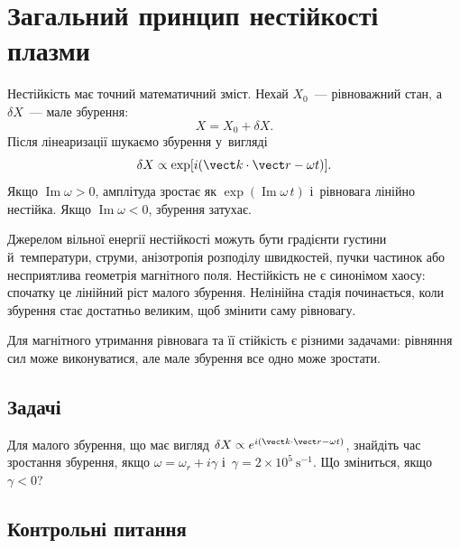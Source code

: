 \chapter{Загальний принцип нестійкості плазми}\label{sec:plasma-instability}\hypertarget{plasma-instability}{}

Нестійкість має точний математичний зміст. Нехай $X_0$~--- рівноважний стан, а~$\delta
X$~--- мале збурення:
\begin{equation*}X=X_0+\delta X.\end{equation*}
Після лінеаризації шукаємо збурення у~вигляді
\begin{equation*}
\delta X\propto\exp[i(\vect k\cdot\vect r-\omega t)].
\end{equation*}
Якщо $\operatorname{Im}\omega>0$, амплітуда зростає як $\exp(\operatorname{Im}\omega\,t)$
і~рівновага лінійно нестійка. Якщо $\operatorname{Im}\omega<0$, збурення затухає.

Джерелом вільної енергії нестійкості можуть бути градієнти густини й~температури, струми,
анізотропія розподілу швидкостей, пучки частинок або несприятлива геометрія магнітного
поля. Нестійкість не є синонімом хаосу: спочатку це лінійний ріст малого збурення.
Нелінійна стадія починається, коли збурення стає достатньо великим, щоб змінити саму
рівновагу.

Для магнітного утримання рівновага та її стійкість є різними задачами: рівняння сил може
виконуватися, але мале збурення все одно може зростати.





\section*{Задачі}

\begin{problem}\label{prb:PlasmaInstabilityGrowth}
Для малого збурення, що має вигляд $\delta X\propto e^{i(\vect k\cdot\vect r-\omega t)}$,
знайдіть час зростання збурення, якщо $\omega=\omega_r+i\gamma$ і~$\gamma=2\times10^5~\mathrm{s}^{-1}$.
Що зміниться, якщо $\gamma<0$?
\end{problem}

\section*{Контрольні питання}

